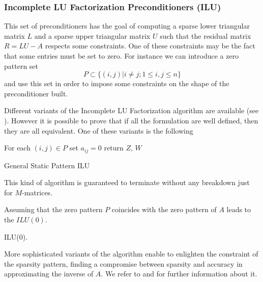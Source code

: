 \documentclass[a4paper,10pt]{article}
\begin{document}
\subsubsection*{Incomplete LU Factorization Preconditioners (ILU)}
This set of preconditioners has the goal of computing a sparse lower triangular 
matrix $L$ and a sparse upper triangular matrix $U$ such that the residual 
matrix $R=LU-A$ respects some constraints. One of these constraints may be the 
fact that some entries must be set to zero.
For instance we can introduce a zero pattern set 
\[
 P\subset \{(i,j)\lvert i\ne j; 1\le i,j\le n\}
\]
and use this set in order to impose some constraints on the shape of the 
preconditioner built.\newline

Different variants of the 
Incomplete LU Factorization algorithm are available (see \cite{Saad}). 
However it is 
possible to prove that if all the formulation are well defined, then they are 
all equivalent. 
One of these variants is the following

\begin{algorithm}[H]
 For each $(i,j)\in P$ set $a_{ij}=0$\;
 return $Z$, $W$\; 
 \caption{General Static Pattern ILU}
\end{algorithm}

This kind of algorithm is guaranteed to terminate without any breakdown just 
for $M$-matrices.

Assuming that the zero pattern $P$ coincides with the zero pattern of $A$ leads 
to the $ILU(0)$. \newline

\begin{algorithm}[H]
 \caption{ILU(0).}
\end{algorithm}

More sophisticated variants of the algorithm enable to enlighten the constraint 
of the sparsity pattern, finding a compromise between sparsity and accuracy in 
approximating the inverse of $A$. We refer to \cite{Saad} and 
\cite{Benzi2002} for further information about it. 
\end{document}
